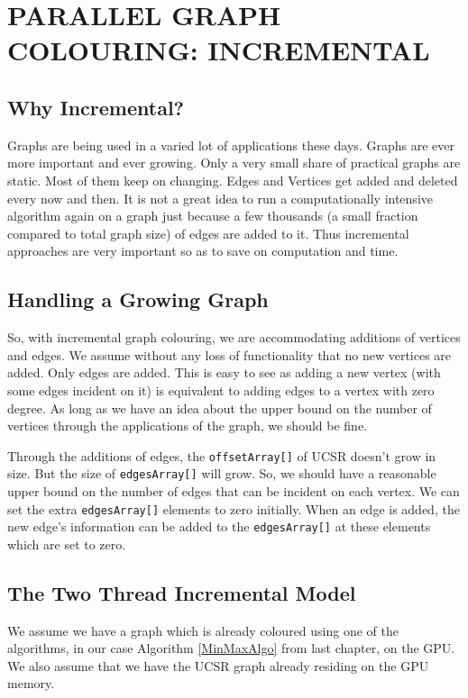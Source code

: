 \documentclass[MTech]{iitmdiss}
\begin{document}
\chapter{PARALLEL GRAPH COLOURING: INCREMENTAL}
\section{Why Incremental?}
Graphs are being used in a varied lot of applications these days. Graphs are ever more important and ever growing. Only a very small share of practical graphs are static. Most of them keep on changing. Edges and Vertices get added and deleted every now and then. It is not a great idea to run a computationally intensive algorithm again on a graph just because a few thousands (a small fraction compared to total graph size) of edges are added to it. Thus incremental approaches are very important so as to save on computation and time.

\section{Handling a Growing Graph}
So, with incremental graph colouring, we are accommodating additions of vertices and edges. We assume without any loss of functionality that no new vertices are added. Only edges are added. This is easy to see as adding a new vertex (with some edges incident on it) is equivalent to adding edges to a vertex with zero degree. As long as we have an idea about the upper bound on the number of vertices through the applications of the graph, we should be fine. 

Through the additions of edges, the \verb+offsetArray[]+ of UCSR doesn't grow in size. But the size of \verb+edgesArray[]+ will grow. So, we should have a reasonable upper bound on the number of edges that can be incident on each vertex. We can set the extra \verb+edgesArray[]+ elements to zero initially. When an edge is added, the new edge's information can be added to the \verb+edgesArray[]+ at these elements which are set to zero.

\section{The Two Thread Incremental Model}
We assume we have a graph which is already coloured using one of the algorithms, in our case Algorithm \ref{MinMaxAlgo} from last chapter, on the GPU. We also assume that we have the UCSR graph already residing on the GPU memory. 
\end{document}
